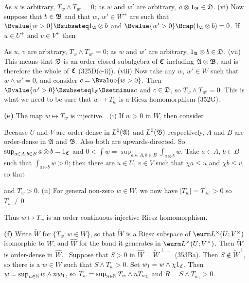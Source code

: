 {

\noindent As $u$ is arbitrary, $T_w\wedge T_{w'}=0$;  as $w$ and $w'$
are arbitrary, $a\otimes 1_{\frak B}\in \frak D$.   (vi)  Now suppose
that $b\in\frak B$ and that $w$, $w'\in W^+$ are such that
$\Bvalue{w>0}\Bsubseteq 1_{\frak A}\otimes b$ and
$\Bvalue{w'>0}\Bcap(1_{\frak A}\otimes b)=0$.   If $u\in U^+$ and
$v\in V^+$ then


\noindent As $u$, $v$ are arbitrary, $T_w\wedge T_{w'}=0$;  as $w$ and
$w'$ are arbitrary, $1_{\frak A}\otimes b\in\frak D$.   (vii) This means
that $\frak D$ is an order-closed subalgebra of $\frak C$ including
$\frak A\otimes\frak B$, and is therefore the whole of $\frak C$
(325D(c-ii)).   (viii) Now take any $w$, $w'\in W$ such that
$w\wedge w'=0$,
and consider $c=\Bvalue{w>0}$.   Then $\Bvalue{w'>0}\Bsubseteq 1_{\frak
C}\Bsetminus c$ and $c\in\frak D$, so $T_w\wedge T_{w'}=0$.   This is
what we need to be sure that $w\mapsto T_w$ is a Riesz homomorphism
(352G).\ \Qed

\medskip

{\bf (e)} The map $w\mapsto T_w$ is injective.   \Prf\ (i) If $w>0$ in
$W$, then consider


\noindent Because $U$ and $V$ are order-dense in $L^0(\frak A)$ and
$L^0(\frak B)$ respectively, $A$ and $B$ are order-dense in $\frak A$
and $\frak B$.   Also both are upwards-directed.   So
$\sup_{a\in A,b\in B}a\otimes b=1_{\frak C}$ and
$0<\int w=\sup_{a\in A,b\in B}\int_{a\otimes b}w$.   Take $a\in A$,
$b\in B$ such that
$\int_{a\otimes b}w>0$;  then there are $u\in U$, $v\in V$ such that
$\chi a\le u$ and $\chi b\le v$, so that


\noindent and $T_w>0$.   (ii) For general non-zero $w\in W$, we now have
$|T_w|=T_{|w|}>0$ so $T_w\ne 0$.\ \Qed

Thus $w\mapsto T_w$ is an order-continuous injective Riesz homomorphism.

\medskip

{\bf (f)} Write $\tilde W$ for $\{T_w:w\in W\}$, so that $\tilde W$ is a
Riesz subspace of $\eurm L^{\times}(U;V^{\times})$ isomorphic to $W$,
and $\widehat{W}$ for the band it generates in
$\eurm L^{\times}(U;V^{\times})$.   Then $\tilde W$ is order-dense in
$\widehat{W}$.   \Prf\ Suppose that $S>0$ in
$\widehat{W}=\tilde W^{\perp\perp}$ (353Ba).   Then
$S\notin\tilde W^{\perp}$, so
there is a $w\in W$ such that $S\wedge T_w>0$.
Set $w_1=w\wedge\chi 1_{\frak C}$.   Then
$w=\sup_{n\in\Bbb N}w\wedge nw_1$, so
$T_w=\sup_{n\in\Bbb N}T_w\wedge nT_{w_1}$ and $R=S\wedge T_{w_1}>0$.

}
